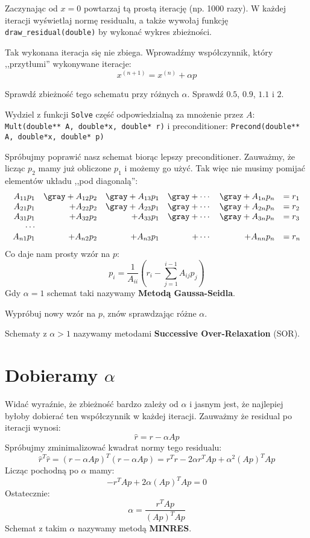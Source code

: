 \documentclass{instrukcja}
\begin{document}
\begin{zad} Zaczynając od $x=0$ powtarzaj tą prostą iterację (np. 1000 razy). W każdej iteracji wyświetlaj normę residualu, a także wywołaj funkcję {\tt draw\_residual(double)} by wykonać wykres zbieżności.\end{zad}

Tak wykonana iteracja się nie zbiega. Wprowadźmy współczynnik, który ,,przytłumi'' wykonywane iteracje:
\[x^{(n+1)} = x^{(n)} + \alpha p\]
\begin{zad} Sprawdź zbieżność tego schematu przy różnych $\alpha$. Sprawdź $0.5$, $0.9$, $1.1$ i $2$.\end{zad}
\begin{zad} Wydziel z funkcji {\tt Solve} część odpowiedzialną za mnożenie przez $A$: {\tt Mult(double** A, double*x, double* r)} i preconditioner: {\tt Precond(double** A, double*x, double* p)}\end{zad}

Spróbujmy poprawić nasz schemat biorąc lepszy preconditioner. Zauważmy, że licząc $p_2$ mamy już obliczone $p_1$ i możemy go użyć. Tak więc nie musimy pomijać elementów układu ,,pod diagonalą'':
\[\begin{array}{rrrrrl}
A_{11}p_1 & \gray +A_{12}p_2&\gray +A_{13}p_1&\gray +\cdots &\gray +A_{1n}p_n&= r_1\\
A_{21}p_1&+ A_{22}p_2 &\gray +A_{23}p_1&\gray +\cdots &\gray +A_{2n}p_n&= r_2\\
A_{31}p_1& +A_{32}p_2&+A_{33}p_1&\gray +\cdots &\gray +A_{3n}p_n&= r_3\\
\cdots\\
A_{n1}p_1& +A_{n2}p_2& +A_{n3}p_1& +\cdots &+A_{nn}p_n&= r_n\\
\end{array}\]
Co daje nam prosty wzór na $p$:
\[p_i = \frac{1}{A_{ii}}(r_i - \sum_{j=1}^{i-1}A_{ij}p_j)\]
Gdy $\alpha=1$ schemat taki nazywamy {\bf Metodą Gaussa-Seidla}. 

\begin{zad} Wypróbuj nowy wzór na $p$, znów sprawdzając różne $\alpha$.\end{zad}

Schematy z $\alpha > 1$ nazywamy metodami {\bf Successive Over-Relaxation} (SOR).

\section{Dobieramy $\alpha$}
Widać wyraźnie, że zbieżność bardzo zależy od $\alpha$ i jasnym jest, że najlepiej byłoby dobierać ten współczynnik w każdej iteracji. Zauważmy że residual po iteracji wynosi:
\[\hat{r} = r - \alpha Ap\]
Spróbujmy zminimalizować kwadrat normy tego residualu:
\[\hat{r}^T\hat{r} = (r - \alpha Ap)^T(r - \alpha Ap) = r^Tr-2\alpha r^TAp+\alpha^2(Ap)^TAp\]
Licząc pochodną po $\alpha$ mamy:
\[-r^TAp+2\alpha(Ap)^TAp=0\]
Ostatecznie:
\[\alpha = \frac{r^TAp}{(Ap)^TAp}\]
Schemat z takim $\alpha$ nazywamy metodą {\bf MINRES}.
\end{document}
